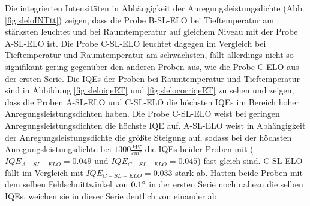 \noindent 
Die integrierten Intensitäten in Abhängigkeit der Anregungsleistungsdichte (Abb. \ref{fig:sleloINTtt}) zeigen, dass die Probe B-SL-ELO bei Tieftemperatur am stärksten leuchtet und bei Raumtemperatur auf gleichem Niveau mit der Probe A-SL-ELO ist. Die Probe C-SL-ELO leuchtet dagegen im Vergleich bei Tieftemperatur und Raumtemperatur am schwächsten, fällt allerdings nicht so signifikant gering gegenüber den anderen Proben aus, wie die Probe C-ELO aus der ersten Serie. 
\newline
Die IQEs der Proben bei Raumtemperatur und Tieftemperatur sind in Abbildung \ref{fig:sleloiqeRT} und \ref{fig:slelocorriqeRT} zu sehen und zeigen, dass die Proben A-SL-ELO und C-SL-ELO die höchsten IQEs im Bereich hoher Anregungsleistungsdichten haben.
\newline
Die Probe C-SL-ELO weist bei geringen Anregungsleistungsdichten die höchste IQE auf. A-SL-ELO weist in Abhängigkeit der Anregungsleistungsdichte die größte Steigung auf, sodass bei der höchsten Anregungsleistungsdichte bei $ 1300 \frac{kW}{cm^2} $ die IQEs beider Proben mit ($IQE_{A-SL-ELO} = 0.049 $ und $IQE_{C-SL-ELO} = 0.045$) fast gleich sind. C-SL-ELO fällt im Vergleich mit $IQE_{C-SL-ELO} = 0.033$ stark ab.  
\newline
Hatten beide Proben mit dem selben Fehlschnittwinkel von $0.1 \degree$ in der ersten Serie noch nahezu die selben IQEs, weichen sie in dieser Serie deutlich von einander ab. 
